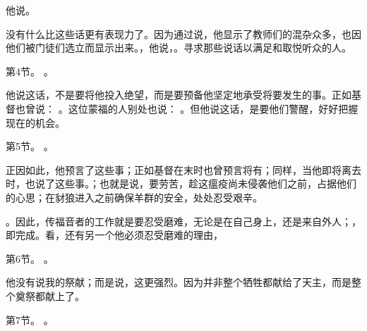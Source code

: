 他说。\par

没有什么比这些话更有表现力了。因为通过说，他显示了教师们的混杂众多，也因他们被门徒们选立而显示出来。，他说，。寻求那些说话以满足和取悦听众的人。\par

第4节。 。\par

他说这话，不是要将他投入绝望，而是要预备他坚定地承受将要发生的事。正如基督也曾说： 。这位蒙福的人别处也说： 。但他说这话，是要他们警醒，好好把握现在的机会。\par

第5节。 。\par

正因如此，他预言了这些事；正如基督在末时也曾预言将有；同样，当他即将离去时，也说了这些事。；也就是说，要劳苦，趁这瘟疫尚未侵袭他们之前，占据他们的心思；在豺狼进入之前确保羊群的安全，处处忍受艰辛。\par

。因此，传福音者的工作就是要忍受磨难，无论是在自己身上，还是来自外人；，即完成。看，还有另一个他必须忍受磨难的理由，\par

第6节。 。\par

他没有说我的祭献；而是说，这更强烈。因为并非整个牺牲都献给了天主，而是整个奠祭都献上了。\par

第7节。 。\par


